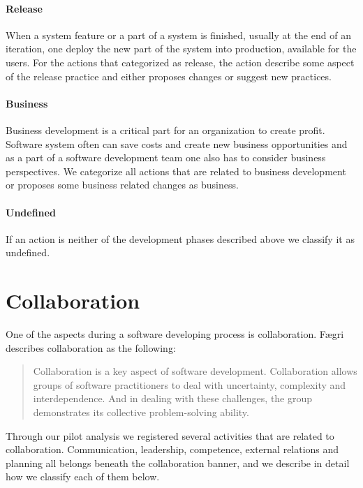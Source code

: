 \paragraph{Release}
When a system feature or a part of a system is finished, usually at the end of an iteration, one deploy the new part of the system into production, available for the users. For the actions that categorized as release, the action describe some aspect of the release practice and either proposes changes or suggest new practices.
\paragraph{Business}
Business development is a critical part for an organization to create profit. Software system often can save costs and create new business opportunities and as a part of a software development team one also has to consider business perspectives. We categorize all actions that are related to business development or proposes some business related changes as business. 
\paragraph{Undefined} If an action is neither of the development phases described above we classify it as undefined. 

\section{Collaboration}
One of the aspects during a software developing process is collaboration. Fægri ~\cite{Faegri2012} describes collaboration as the following: 
\begin{quote}
Collaboration is a key aspect of software development. Collaboration allows groups of software practitioners to deal with uncertainty, complexity and interdependence. And in dealing with these challenges, the group demonstrates its collective problem-solving ability.
\end{quote}
Through our pilot analysis we registered several activities that are related to collaboration. Communication, leadership, competence, external relations and planning all belongs beneath the collaboration banner, and we describe in detail how we classify each of them below. 
